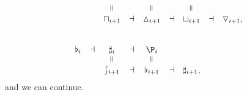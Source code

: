 \documentclass[a4paper]{memoir}
\begin{document}
\begin{example}
\begin{itemize}
\begin{itemize}
\begin{itemize}
\[\begin{array}{c c c c c c c c c}
						&&
						\rotatebox{90}{$=$}
						&&
						\rotatebox{90}{$=$}
						&&
						\rotatebox{90}{$=$}
						&&
						\\
						&&
						\cohpi_{i+1}
						&\dashv&
						\cohdisc_{i+1}
						&\dashv&
						\cohfget_{i+1}
						&\dashv&
						\cohcodisc_{i+1},
						\\
						\phantom{a}
						\\
						\phantom{a}
						\\
						\flat_i
						&\dashv&
						\sharp_i
						&\dashv&
						\coshp_i
						\\
						&&
						\rotatebox{90}{$=$}
						&&
						\rotatebox{90}{$=$}
						&&
						\\
						&&
						\shp_{i+1}
						&\dashv&
						\flat_{i+1}
						&\dashv&
						\sharp_{i+1},
					\end{array}
				\]
				and we can continue.
			\end{itemize}
		\end{itemize}
	\end{itemize}
\end{example}
\end{document}
